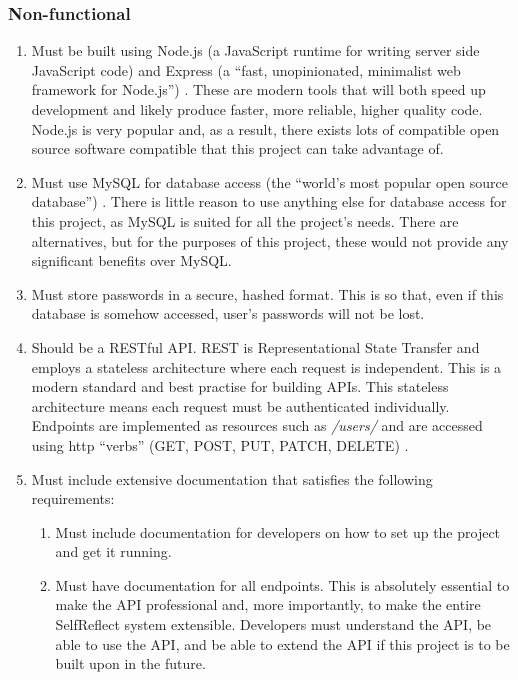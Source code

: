 \documentclass[11pt,openright,a4paper]{report}
\begin{document}
\subsubsection{Non-functional}
\begin{enumerate}
\item Must be built using Node.js (a JavaScript runtime for writing server side JavaScript code) \parencite{nodejs} and Express (a \enquote{fast, unopinionated, minimalist web framework for Node.js}) \parencite{expressjs}. These are modern tools that will both speed up development and likely produce faster, more reliable, higher quality code. Node.js is very popular and, as a result, there exists lots of compatible open source software compatible that this project can take advantage of.
\item Must use MySQL for database access (the \enquote{world's most popular open source database}) \parencite{mysql}. There is little reason to use anything else for database access for this project, as MySQL is suited for all the project's needs. There are alternatives, but for the purposes of this project, these would not provide any significant benefits over MySQL.
\item Must store passwords in a secure, hashed format. This is so that, even if this database is somehow accessed, user's passwords will not be lost.
\item Should be a RESTful API. REST is Representational State Transfer and employs a stateless architecture where each request is independent. This is a modern standard and best practise for building APIs. This stateless architecture means each request must be authenticated individually. Endpoints are implemented as resources such as \emph{/users/} and are accessed using http \enquote{verbs} (GET, POST, PUT, PATCH, DELETE) \parencite{httpmethods}.
\item Must include extensive documentation that satisfies the following requirements:
  \begin{enumerate}
  \item Must include documentation for developers on how to set up the project and get it running.
  \item Must have documentation for all endpoints. This is absolutely essential to make the API professional and, more importantly, to make the entire SelfReflect system extensible. Developers must understand the API, be able to use the API, and be able to extend the API if this project is to be built upon in the future.
  \end{enumerate}

\end{enumerate}
\end{document}
